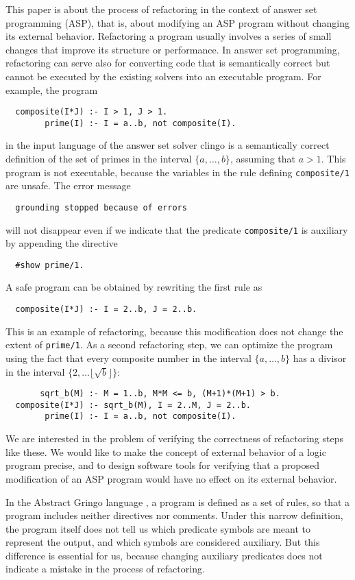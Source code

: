 \documentclass{new_tlp}
\begin{document}
This paper is about the process of refactoring in the context of answer set
programming (ASP),
that is, about modifying an ASP program without changing
its external behavior.  Refactoring a program usually involves a series of
small changes that improve its structure or performance.  In answer set
programming, refactoring can serve also for converting code that is
semantically correct but cannot be executed by the existing solvers into an
executable program.  For example, the program
\begin{verbatim}
  composite(I*J) :- I > 1, J > 1.
        prime(I) :- I = a..b, not composite(I).
\end{verbatim}
in the input language of the answer set solver {\sc clingo} \cite{geb12}
is a semantically correct definition of the set of primes in the
interval $\{a,\dots,b\}$, assuming that $a>1$.  This program
is not executable, because the variables in
the rule defining \verb|composite/1| are unsafe.  The error message
\begin{verbatim}
  grounding stopped because of errors
\end{verbatim}
will not disappear even if we indicate that the predicate
\verb|composite/1| is auxiliary by appending the directive
\begin{verbatim}
  #show prime/1.
\end{verbatim}
A safe program can be obtained by rewriting the first rule as
\begin{verbatim}
  composite(I*J) :- I = 2..b, J = 2..b.
\end{verbatim}
This is an example of refactoring, because this modification
does not change the extent of \verb|prime/1|.
As a second refactoring step, we can optimize the program using the
fact that every composite
number in the interval $\{a,\dots,b\}$ has a divisor in the interval
$\{2,\dots\lfloor \sqrt b\rfloor\}$:
\begin{verbatim}
       sqrt_b(M) :- M = 1..b, M*M <= b, (M+1)*(M+1) > b.
  composite(I*J) :- sqrt_b(M), I = 2..M, J = 2..b.
        prime(I) :- I = a..b, not composite(I).
\end{verbatim}

We are interested in the problem of verifying the correctness of
refactoring steps like these. We would like to make the concept of external
behavior of a logic program precise, and to
design software tools for verifying that a proposed modification of an
ASP program would have no effect on its external behavior.

In the Abstract Gringo language \cite{geb15}, a program is defined as
a set of rules, so that a program
includes neither directives nor comments.  Under this narrow definition,
the program itself does not tell us which predicate symbols are meant to
represent the output, and which symbols are considered
auxiliary.  But this difference is essential for us, because changing
auxiliary predicates does not indicate a mistake in the process of
refactoring.
\end{document}
